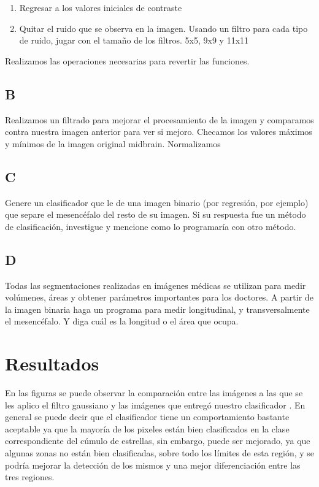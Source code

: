 \documentclass[10pt,journal,compsoc]{IEEEtran}
\begin{document}
\begin{enumerate}
  \item Regresar a los valores iniciales de contraste
  \item Quitar el ruido que se observa en la imagen. Usando un filtro para cada tipo de ruido, jugar con el tamaño de los filtros. 5x5, 9x9 y 11x11
\end{enumerate}

Realizamos las operaciones necesarias para revertir las funciones.

\subsection{B}

Realizamos un filtrado para mejorar el procesamiento de la imagen y comparamos  contra nuestra imagen anterior para ver si mejoro.
Checamos los valores máximos y mínimos de la imagen original midbrain. Normalizamos

\subsection{C}

Genere un clasificador que le de una imagen binario (por regresión, por ejemplo) que separe el mesencéfalo del resto de su imagen. Si su respuesta fue un método de clasificación, investigue y mencione como lo programaría con otro método.

\subsection{D}

Todas las segmentaciones realizadas en imágenes médicas se utilizan para medir volúmenes, áreas y obtener parámetros importantes para los doctores. A partir de la imagen binaria haga un programa para medir longitudinal, y transversalmente el mesencéfalo. Y diga cuál es la longitud o el área que ocupa.

\section{Resultados}


En las figuras se puede observar la comparación entre las imágenes a las que se les aplico el filtro gaussiano y las imágenes que entregó nuestro clasificador .
En general se puede decir que el clasificador tiene un comportamiento bastante aceptable ya que la mayoría de los pixeles están bien clasificados en la clase correspondiente del cúmulo de estrellas, sin embargo, puede ser mejorado, ya que algunas zonas no están bien clasificadas, sobre todo los límites de esta región, y se podría mejorar la detección de los mismos y una mejor diferenciación entre las tres regiones.
\end{document}
